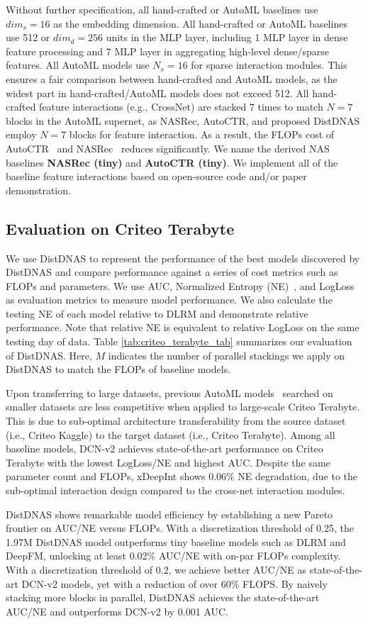 Without further specification, 
all hand-crafted or AutoML baselines use $dim_{s}=16$ as the embedding dimension.
All hand-crafted or AutoML baselines use 512 or $dim_{d}=256$ units in the MLP layer, including 1 MLP layer in dense feature processing and 7 MLP layer in aggregating high-level dense/sparse features.
All AutoML models use $N_{s}=16$ for sparse interaction modules.
This ensures a fair comparison between hand-crafted and AutoML models, as the widest part in hand-crafted/AutoML models does not exceed 512.
All hand-crafted feature interactions (e.g., CrossNet) are stacked 7 times to match $N=7$ blocks in the AutoML supernet, as NASRec, AutoCTR, and proposed DistDNAS employ $N=7$ blocks for feature interaction. As a result, the FLOPs cost of AutoCTR~\cite{song2020towards} and NASRec~\cite{zhang2022nasrec} reduces significantly. We name the derived NAS baselines \textbf{NASRec (tiny)} and \textbf{AutoCTR (tiny)}. We implement all of the baseline feature interactions based on open-source code and/or paper demonstration. 

\subsection{Evaluation on Criteo Terabyte}
We use DistDNAS to represent the performance of the best models discovered by DistDNAS and compare performance against a series of cost metrics such as FLOPs and parameters. 
We use AUC, Normalized Entropy (NE)~\cite{he2014practical}, and LogLoss as evaluation metrics to measure model performance.
We also calculate the testing NE of each model relative to DLRM and demonstrate relative performance. Note that relative NE is equivalent to relative LogLoss on the same testing day of data. 
Table \ref{tab:criteo_terabyte_tab} summarizes our evaluation of DistDNAS.
Here, $M$ indicates the number of parallel stackings we apply on DistDNAS to match the FLOPs of baseline models.

Upon transferring to large datasets, previous AutoML models~\cite{song2020towards,zhang2022nasrec} searched on smaller datasets are less competitive when applied to large-scale Criteo Terabyte. This is due to sub-optimal architecture transferability from the source dataset (i.e., Criteo Kaggle) to the target dataset (i.e., Criteo Terabyte). Among all baseline models, DCN-v2 achieves state-of-the-art performance on Criteo Terabyte with the lowest LogLoss/NE and highest AUC. Despite the same parameter count and FLOPs, xDeepInt shows 0.06\% NE degradation, due to the sub-optimal interaction design compared to the cross-net interaction modules.

DistDNAS shows remarkable model efficiency by establishing a new Pareto frontier on AUC/NE versus FLOPs.
With a discretization threshold of 0.25, the 1.97M DistDNAS model outperforms tiny baseline models such as DLRM and DeepFM, unlocking at least 0.02\% AUC/NE with on-par FLOPs complexity.
With a discretization threshold of 0.2, we achieve better AUC/NE as state-of-the-art DCN-v2 models, yet with a reduction of over 60\% FLOPS.
By naively stacking more blocks in parallel, DistDNAS achieves the state-of-the-art AUC/NE and outperforms DCN-v2 by 0.001 AUC.

